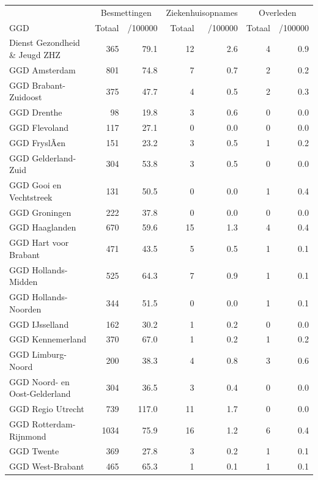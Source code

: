 \documentclass[
  english,
  man,floatsintext]{apa6}
\begin{document}
\begin{table}
\centering\begingroup\fontsize{10}{12}\selectfont

\begin{threeparttable}
\begin{tabular}{lrrrrrr}
\toprule
\multicolumn{1}{c}{ } & \multicolumn{2}{c}{Besmettingen} & \multicolumn{2}{c}{Ziekenhuisopnames} & \multicolumn{2}{c}{Overleden} \\
\cmidrule(l{3pt}r{3pt}){2-3} \cmidrule(l{3pt}r{3pt}){4-5} \cmidrule(l{3pt}r{3pt}){6-7}
GGD & Totaal & /100000 & Totaal & /100000 & Totaal & /100000\\
\midrule
Dienst Gezondheid \& Jeugd ZHZ & 365 & 79.1 & 12 & 2.6 & 4 & 0.9\\
GGD Amsterdam & 801 & 74.8 & 7 & 0.7 & 2 & 0.2\\
GGD Brabant-Zuidoost & 375 & 47.7 & 4 & 0.5 & 2 & 0.3\\
GGD Drenthe & 98 & 19.8 & 3 & 0.6 & 0 & 0.0\\
GGD Flevoland & 117 & 27.1 & 0 & 0.0 & 0 & 0.0\\
GGD FryslÃ¢n & 151 & 23.2 & 3 & 0.5 & 1 & 0.2\\
GGD Gelderland-Zuid & 304 & 53.8 & 3 & 0.5 & 0 & 0.0\\
GGD Gooi en Vechtstreek & 131 & 50.5 & 0 & 0.0 & 1 & 0.4\\
GGD Groningen & 222 & 37.8 & 0 & 0.0 & 0 & 0.0\\
GGD Haaglanden & 670 & 59.6 & 15 & 1.3 & 4 & 0.4\\
GGD Hart voor Brabant & 471 & 43.5 & 5 & 0.5 & 1 & 0.1\\
GGD Hollands-Midden & 525 & 64.3 & 7 & 0.9 & 1 & 0.1\\
GGD Hollands-Noorden & 344 & 51.5 & 0 & 0.0 & 1 & 0.1\\
GGD IJsselland & 162 & 30.2 & 1 & 0.2 & 0 & 0.0\\
GGD Kennemerland & 370 & 67.0 & 1 & 0.2 & 1 & 0.2\\
GGD Limburg-Noord & 200 & 38.3 & 4 & 0.8 & 3 & 0.6\\
GGD Noord- en Oost-Gelderland & 304 & 36.5 & 3 & 0.4 & 0 & 0.0\\
GGD Regio Utrecht & 739 & 117.0 & 11 & 1.7 & 0 & 0.0\\
GGD Rotterdam-Rijnmond & 1034 & 75.9 & 16 & 1.2 & 6 & 0.4\\
GGD Twente & 369 & 27.8 & 3 & 0.2 & 1 & 0.1\\
GGD West-Brabant & 465 & 65.3 & 1 & 0.1 & 1 & 0.1\\

\end{tabular}
\end{threeparttable}
\end{table}
\end{document}
